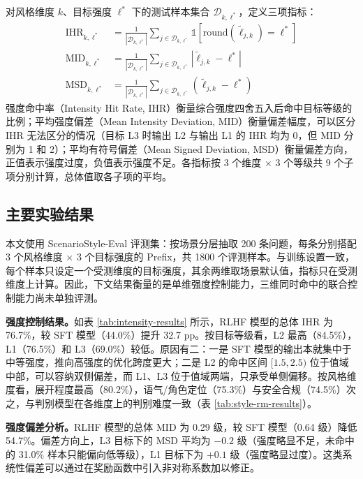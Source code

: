 \documentclass[fontset=fandol,type=master,campus=shenzhen,etitleauto=true]{hithesisbook}
\begin{document}
对风格维度 $k$、目标强度 $\ell^*$ 下的测试样本集合 $\mathcal{D}_{k,\ell^*}$，定义三项指标：
\begin{equation}
\begin{aligned}
\text{IHR}_{k,\ell^*} &= \frac{1}{|\mathcal{D}_{k,\ell^*}|} \sum_{j \in \mathcal{D}_{k,\ell^*}} \mathbb{1}\!\left[\text{round}(\tilde{\ell}_{j,k}) = \ell^*\right] \\
\text{MID}_{k,\ell^*} &= \frac{1}{|\mathcal{D}_{k,\ell^*}|} \sum_{j \in \mathcal{D}_{k,\ell^*}} \left|\tilde{\ell}_{j,k} - \ell^*\right| \\
\text{MSD}_{k,\ell^*} &= \frac{1}{|\mathcal{D}_{k,\ell^*}|} \sum_{j \in \mathcal{D}_{k,\ell^*}} \left(\tilde{\ell}_{j,k} - \ell^*\right)
\end{aligned}
\end{equation}
强度命中率（Intensity Hit Rate, IHR）衡量综合强度四舍五入后命中目标等级的比例；平均强度偏差（Mean Intensity Deviation, MID）衡量偏差幅度，可以区分 IHR 无法区分的情况（目标 L3 时输出 L2 与输出 L1 的 IHR 均为 0，但 MID 分别为 1 和 2）；平均有符号偏差（Mean Signed Deviation, MSD）衡量偏差方向，正值表示强度过度，负值表示强度不足。各指标按 3 个维度 × 3 个等级共 9 个子项分别计算，总体值取各子项的平均。

\subsection{主要实验结果}\label{ux4e3bux8981ux7ed3ux679c-1}

本文使用 ScenarioStyle-Eval 评测集：按场景分层抽取 200 条问题，每条分别搭配 3 个风格维度 × 3 个目标强度的 Prefix，共 1800 个评测样本。与训练设置一致，每个样本只设定一个受测维度的目标强度，其余两维取场景默认值，指标只在受测维度上计算。因此，下文结果衡量的是单维强度控制能力，三维同时命中的联合控制能力尚未单独评测。

\textbf{强度控制结果。}如表 \ref{tab:intensity-results} 所示，RLHF 模型的总体 IHR 为 76.7\%，较 SFT 模型（44.0\%）提升 32.7 pp。按目标等级看，L2 最高（84.5\%），L1（76.5\%）和 L3（69.0\%）较低。原因有二：一是 SFT 模型的输出本就集中于中等强度，推向高强度的优化跨度更大；二是 L2 的命中区间 $[1.5, 2.5)$ 位于值域中部，可以容纳双侧偏差，而 L1、L3 位于值域两端，只承受单侧偏移。按风格维度看，展开程度最高（80.2\%），语气/角色定位（75.3\%）与安全合规（74.5\%）次之，与判别模型在各维度上的判别难度一致（表 \ref{tab:style-rm-results}）。

\textbf{强度偏差分析。}RLHF 模型的总体 MID 为 0.29 级，较 SFT 模型（0.64 级）降低 54.7\%。偏差方向上，L3 目标下的 MSD 平均为 $-0.2$ 级（强度略显不足，未命中的 31.0\% 样本只能偏向低等级），L1 目标下为 $+0.1$ 级（强度略显过度）。这类系统性偏差可以通过在奖励函数中引入非对称系数加以修正。
\end{document}
